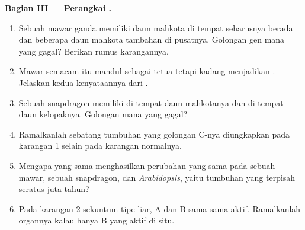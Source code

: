 \begin{problem}
\medskip
\noindent\textbf{Bagian III --- Perangkai .}
\begin{enumerate}[resume]
  \item Sebuah mawar ganda memiliki daun mahkota di tempat  seharusnya berada dan beberapa daun mahkota tambahan di
        pusatnya. Golongan gen mana yang gagal? Berikan rumus
        karangannya.
  \item Mawar semacam itu mandul sebagai tetua  tetapi
        kadang menjadikan . Jelaskan kedua kenyataannya dari .
  \item Sebuah snapdragon memiliki  di tempat daun
        mahkotanya dan  di tempat daun kelopaknya. Golongan
        mana yang gagal?
  \item Ramalkanlah  sebatang tumbuhan yang golongan C-nya
        diungkapkan pada karangan 1 selain pada karangan normalnya.
  \item Mengapa  yang sama menghasilkan perubahan yang sama pada
        sebuah mawar, sebuah snapdragon, dan \emph{Arabidopsis}, yaitu
        tumbuhan yang terpisah seratus juta tahun?
  \item Pada karangan 2 sekuntum  tipe liar, A dan B sama-sama
        aktif. Ramalkanlah organnya kalau hanya B yang aktif di situ.
\end{enumerate}


\end{problem}
